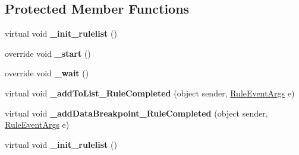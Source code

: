 \subsection*{Protected Member Functions}
\begin{DoxyCompactItemize}
\item 
\hypertarget{classlib_watcher_dialog_1_1_combine_rules_1_1_add_data_breakpoint_form_script_ac70b43da77aa41728fd4aa18beabf816}{virtual void {\bfseries \+\_\+init\+\_\+rulelist} ()}\label{classlib_watcher_dialog_1_1_combine_rules_1_1_add_data_breakpoint_form_script_ac70b43da77aa41728fd4aa18beabf816}

\item 
\hypertarget{classlib_watcher_dialog_1_1_combine_rules_1_1_add_data_breakpoint_form_script_a598517962fa44eef8095cc329f94ae18}{override void {\bfseries \+\_\+start} ()}\label{classlib_watcher_dialog_1_1_combine_rules_1_1_add_data_breakpoint_form_script_a598517962fa44eef8095cc329f94ae18}

\item 
\hypertarget{classlib_watcher_dialog_1_1_combine_rules_1_1_add_data_breakpoint_form_script_add5128bf1ce25b09dbbec3fcffee2bef}{override void {\bfseries \+\_\+wait} ()}\label{classlib_watcher_dialog_1_1_combine_rules_1_1_add_data_breakpoint_form_script_add5128bf1ce25b09dbbec3fcffee2bef}

\item 
\hypertarget{classlib_watcher_dialog_1_1_combine_rules_1_1_add_data_breakpoint_form_script_a742a19a8a58b3fb07e5c7959b8740a89}{virtual void {\bfseries \+\_\+add\+To\+List\+\_\+\+Rule\+Completed} (object sender, \hyperlink{class_watcher_1_1_debugger_1_1_event_args_1_1_rule_event_args}{Rule\+Event\+Args} e)}\label{classlib_watcher_dialog_1_1_combine_rules_1_1_add_data_breakpoint_form_script_a742a19a8a58b3fb07e5c7959b8740a89}

\item 
\hypertarget{classlib_watcher_dialog_1_1_combine_rules_1_1_add_data_breakpoint_form_script_a71e66122ce5d53aa03958cb6071015ce}{virtual void {\bfseries \+\_\+add\+Data\+Breakpoint\+\_\+\+Rule\+Completed} (object sender, \hyperlink{class_watcher_1_1_debugger_1_1_event_args_1_1_rule_event_args}{Rule\+Event\+Args} e)}\label{classlib_watcher_dialog_1_1_combine_rules_1_1_add_data_breakpoint_form_script_a71e66122ce5d53aa03958cb6071015ce}

\item 
\hypertarget{classlib_watcher_dialog_1_1_combine_rules_1_1_add_data_breakpoint_form_script_ac70b43da77aa41728fd4aa18beabf816}{virtual void {\bfseries \+\_\+init\+\_\+rulelist} ()}\label{classlib_watcher_dialog_1_1_combine_rules_1_1_add_data_breakpoint_form_script_ac70b43da77aa41728fd4aa18beabf816}


\end{DoxyCompactItemize}
